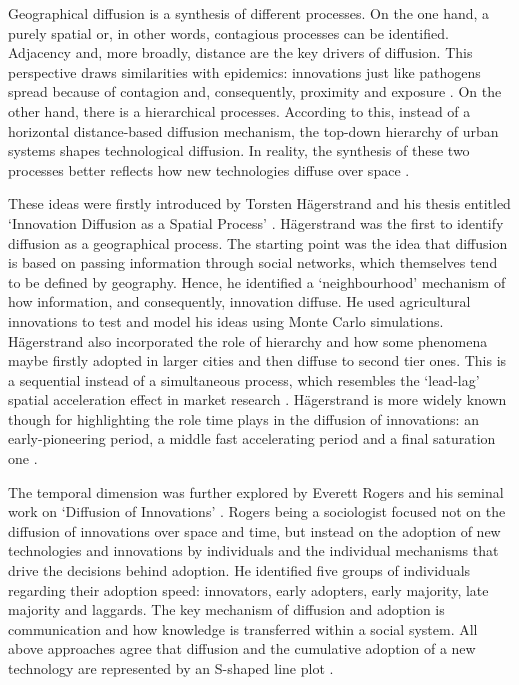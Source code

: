 \documentclass[
  authoryear,
  preprint,
  3p]{elsarticle}
\begin{document}
Geographical diffusion is a synthesis of different processes. On the one
hand, a purely spatial or, in other words, contagious processes can be
identified. Adjacency and, more broadly, distance are the key drivers of
diffusion. This perspective draws similarities with epidemics:
innovations just like pathogens spread because of contagion and,
consequently, proximity and exposure \citep{hivner2003facilitating}. On
the other hand, there is a hierarchical processes. According to this,
instead of a horizontal distance-based diffusion mechanism, the top-down
hierarchy of urban systems shapes technological diffusion. In reality,
the synthesis of these two processes better reflects how new
technologies diffuse over space \citep{morrill2020spatial}.

These ideas were firstly introduced by Torsten Hägerstrand and his
thesis entitled `Innovation Diffusion as a Spatial Process'
\citep{hagerstrand1968innovation}. Hägerstrand was the first to identify
diffusion as a geographical process. The starting point was the idea
that diffusion is based on passing information through social networks,
which themselves tend to be defined by geography. Hence, he identified a
`neighbourhood' mechanism of how information, and consequently,
innovation diffuse. He used agricultural innovations to test and model
his ideas using Monte Carlo simulations. Hägerstrand also incorporated
the role of hierarchy and how some phenomena maybe firstly adopted in
larger cities and then diffuse to second tier ones. This is a sequential
instead of a simultaneous process, which resembles the `lead-lag'
spatial acceleration effect in market research
\citep{bento2018time, PERES201091}. Hägerstrand is more widely known
though for highlighting the role time plays in the diffusion of
innovations: an early-pioneering period, a middle fast accelerating
period and a final saturation one \citep{morrill2020spatial}.

The temporal dimension was further explored by Everett Rogers and his
seminal work on `Diffusion of Innovations' \citep{rogers2010diffusion}.
Rogers being a sociologist focused not on the diffusion of innovations
over space and time, but instead on the adoption of new technologies and
innovations by individuals and the individual mechanisms that drive the
decisions behind adoption. He identified five groups of individuals
regarding their adoption speed: innovators, early adopters, early
majority, late majority and laggards. The key mechanism of diffusion and
adoption is communication and how knowledge is transferred within a
social system. All above approaches agree that diffusion and the
cumulative adoption of a new technology are represented by an S-shaped
line plot \citep{grubler1990rise}.
\end{document}
